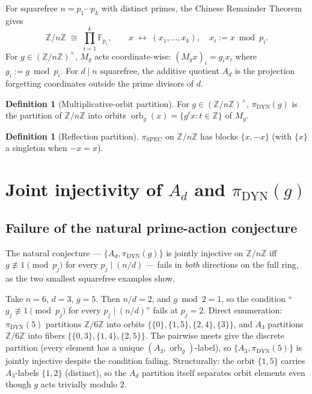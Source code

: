 \documentclass[11pt,reqno]{amsart}
\theoremstyle{plain}
\theoremstyle{definition}
\newtheorem{definition}[theorem]{Definition}
\theoremstyle{remark}
\DeclareMathOperator{\orb}{orb}
\DeclareMathOperator{\spec}{SPEC}
\DeclareMathOperator{\dyn}{DYN}
\newcommand{\Z}{\mathbb{Z}}
\newcommand{\F}{\mathbb{F}}
\begin{document}
For squarefree $n = p_{1} \cdots p_{k}$ with distinct primes, the
Chinese Remainder Theorem \cite[\S I.5]{Lang2002} gives
\[
  \Z/n\Z \;\cong\; \prod_{i=1}^{k} \F_{p_{i}}, \qquad x \;\longleftrightarrow\;
  (x_{1}, \ldots, x_{k}), \quad x_{i} := x \bmod p_{i}.
\]
For $g \in (\Z/n\Z)^{\times}$, $M_{g}$ acts coordinate-wise:
$(M_{g} x)_{i} = g_{i} x_{i}$ where $g_{i} := g \bmod p_{i}$. For
$d \mid n$ squarefree, the additive quotient $A_{d}$ is the projection
forgetting coordinates outside the prime divisors of $d$.

\begin{definition}[Multiplicative-orbit partition]\label{def:dyn}
For $g \in (\Z/n\Z)^{\times}$, $\pi_{\dyn}(g)$ is the partition of
$\Z/n\Z$ into orbits $\orb_{g}(x) = \{g^{t} x : t \in \Z\}$ of $M_{g}$.
\end{definition}

\begin{definition}[Reflection partition]\label{def:spec}
$\pi_{\spec}$ on $\Z/n\Z$ has blocks $\{x, -x\}$ (with $\{x\}$ a
singleton when $-x = x$).
\end{definition}

\section{Joint injectivity of $A_{d}$ and $\pi_{\dyn}(g)$}\label{sec:joint}

\subsection{Failure of the natural prime-action conjecture}\label{subsec:open}

The natural conjecture --- $\{A_{d}, \pi_{\dyn}(g)\}$ is jointly
injective on $\Z/n\Z$ iff $g \not\equiv 1 \pmod{p_{j}}$ for every
$p_{j} \mid (n/d)$ --- fails in \emph{both} directions on the full
ring, as the two smallest squarefree examples show.

\begin{example}\label{ex:necessary-fails}
Take $n = 6$, $d = 3$, $g = 5$. Then $n/d = 2$, and $g \bmod 2 = 1$,
so the condition ``$g_{j} \not\equiv 1 \pmod{p_{j}}$ for every $p_{j}
\mid (n/d)$'' fails at $p_{j} = 2$. Direct enumeration:
$\pi_{\dyn}(5)$ partitions $\Z/6\Z$ into orbits
$\{\{0\}, \{1, 5\}, \{2, 4\}, \{3\}\}$,
and $A_{3}$ partitions $\Z/6\Z$ into fibers $\{\{0, 3\}, \{1, 4\}, \{2, 5\}\}$.
The pairwise meets give the discrete partition (every element has a
unique $(A_{3}, \orb_{g})$-label), so $\{A_{3}, \pi_{\dyn}(5)\}$ is
jointly injective despite the condition failing. Structurally: the
orbit $\{1, 5\}$ carries $A_{3}$-labels $\{1, 2\}$ (distinct), so the
$A_{d}$ partition itself separates orbit elements even though $g$
acts trivially modulo $2$.
\end{example}
\end{document}
